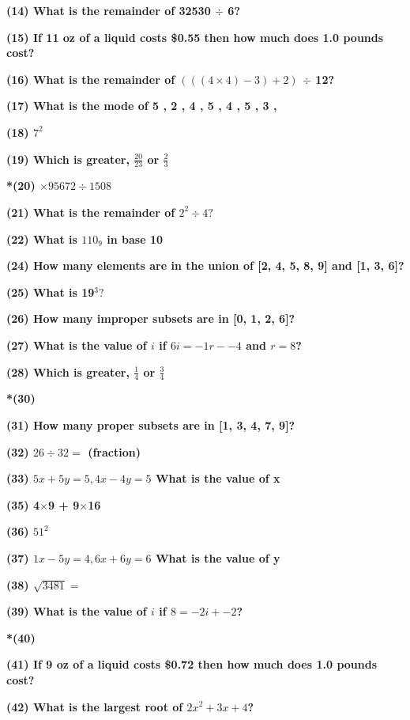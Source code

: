 \documentclass{article}
\begin{document}
{\begin{multicols}{2}
\begin{flushleft}
\textbf{(14) What is the remainder of 32530 $\div$ 6?\hrulefill}

\textbf{(15) If 11 oz of a liquid costs \$0.55 then how much does 1.0 pounds cost?\hrulefill}

\textbf{(16) What is the remainder of $(((4 \times 4) - 3) + 2)$ $\div$ 12?\hrulefill}

\textbf{(17) What is the mode of 5 , 2 , 4 , 5 , 4 , 5 , 3 , \hrulefill}

\textbf{(18) $7^{2}$\hrulefill}

\textbf{(19) Which is greater, $\frac{20}{23}$ or $\frac{2}{3}$\hrulefill}

\textbf{*(20) $\times95672\div1508$\hrulefill}

\textbf{(21) What is the remainder of $2^{2}\div4?$\hrulefill}

\textbf{(22) What is $110_ {9}$ in base 10\hrulefill}

\textbf{(24) How many elements are in the union of [2, 4, 5, 8, 9] and [1, 3, 6]?\hrulefill}

\textbf{(25) What is 19$^{3}?$\hrulefill}

\textbf{(26) How many improper subsets are in [0, 1, 2, 6]?\hrulefill}

\textbf{(27) What is the value of $i $ if $6i = -1r - -4$ and $r = 8$?\hrulefill}

\textbf{(28) Which is greater, $\frac{1}{4}$ or $\frac{3}{4}$\hrulefill}

\textbf{*(30) \hrulefill}

\textbf{(31) How many proper subsets are in [1, 3, 4, 7, 9]?\hrulefill}

\textbf{(32) $26\div32 = $ \hrulefill (fraction)}

\textbf{(33) $5x + 5y = 5 , 4x - 4y = 5$ What is the value of  x \hrulefill}

\textbf{(35) 4$\times$9 + 9$\times$16\hrulefill}

\textbf{(36) $51^{2}$\hrulefill}

\textbf{(37) $1x - 5y = 4 , 6x + 6y = 6$ What is the value of  y \hrulefill}

\textbf{(38) $\sqrt{3481}=$\hrulefill}

\textbf{(39) What is the value of $i$ if $8 = -2i + -2$?\hrulefill}

\textbf{*(40) \hrulefill}

\textbf{(41) If 9 oz of a liquid costs \$0.72 then how much does 1.0 pounds cost?\hrulefill}

\textbf{(42) What is the largest root of $2x^2 + 3x + 4$?\hrulefill}


\end{flushleft}
\end{multicols}}
\end{document}
